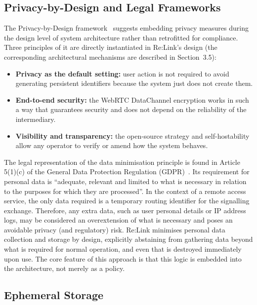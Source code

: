 \documentclass[12pt,a4paper,oneside]{report}
\begin{document}
\subsection{Privacy-by-Design and Legal Frameworks}
\label{sec:pbd-legal}

The Privacy-by-Design framework~\cite{cavoukian2011} suggests embedding privacy measures during the design level of system architecture rather than retrofitted for compliance. Three principles of it are directly instantiated in Re:Link's design (the corresponding architectural mechanisms are described in Section~3.5):

\begin{itemize}
  \item \textbf{Privacy as the default setting:} user action is not required to avoid generating persistent identifiers because the system just does not create them.
  \item \textbf{End-to-end security:} the WebRTC DataChannel encryption works in such a way that guarantees security and does not depend on the reliability of the intermediary.
  \item \textbf{Visibility and transparency:} the open-source strategy and self-hostability allow any operator to verify or amend how the system behaves.
\end{itemize}

The legal representation of the data minimisation principle is found in Article 5(1)(c) of the General Data Protection Regulation (GDPR)~\cite{gdpr5}. Its requirement for personal data is ``adequate, relevant and limited to what is necessary in relation to the purposes for which they are processed''. In the context of a remote access service, the only data required is a temporary routing identifier for the signalling exchange. Therefore, any extra data, such as user personal details or IP address logs, may be considered an overextension of what is necessary and poses an avoidable privacy (and regulatory) risk. Re:Link minimises personal data collection and storage by design, explicitly abstaining from gathering data beyond what is required for normal operation, and even that is destroyed immediately upon use. The core feature of this approach is that this logic is embedded into the architecture, not merely as a policy.


\subsection{Ephemeral Storage}
\label{sec:ephemeral-storage}
\end{document}
